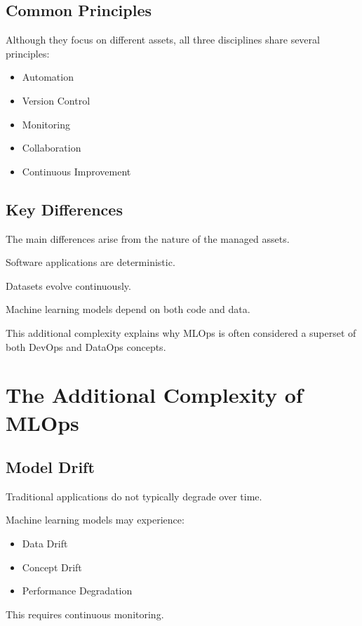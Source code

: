 \subsection{Common Principles}

Although they focus on different assets, all three disciplines share several principles:

\begin{itemize}
    \item Automation
    \item Version Control
    \item Monitoring
    \item Collaboration
    \item Continuous Improvement
\end{itemize}

\subsection{Key Differences}

The main differences arise from the nature of the managed assets.

Software applications are deterministic.

Datasets evolve continuously.

Machine learning models depend on both code and data.

This additional complexity explains why MLOps is often considered a superset of both DevOps and DataOps concepts.

\section{The Additional Complexity of MLOps}

\subsection{Model Drift}

Traditional applications do not typically degrade over time.

Machine learning models may experience:

\begin{itemize}
    \item Data Drift
    \item Concept Drift
    \item Performance Degradation
\end{itemize}

This requires continuous monitoring.


